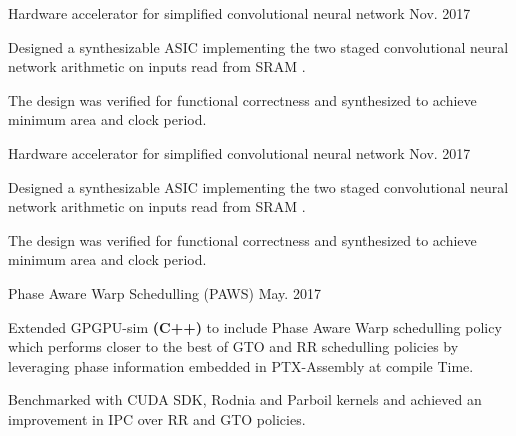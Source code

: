 \begin{cvprojects}
    \par\addvspace{0ex}
    \begin{flushleft}
    \par\addvspace{-1.5mm}
    \fontsize{10.4pt}{1em}\selectfont{}
    \end{flushleft}
    \par\addvspace{0.3ex}
    \cvproject
    {Hardware accelerator for simplified convolutional neural network }
    {\color{darkgray}Nov. 2017}
    {
      \begin{cvprojectitems}
        \item {Designed a synthesizable ASIC implementing the two staged convolutional neural network arithmetic on inputs read from SRAM . }
        \item {The design was verified for functional correctness and synthesized to achieve minimum area and clock period.} 
      \end{cvprojectitems}
    }

    \cvproject
    {Hardware accelerator for simplified convolutional neural network }
    {\color{darkgray}Nov. 2017}
    {
      \begin{cvprojectitems}
        \item {Designed a synthesizable ASIC implementing the two staged convolutional neural network arithmetic on inputs read from SRAM . }
        \item {The design was verified for functional correctness and synthesized to achieve minimum area and clock period.} 
      \end{cvprojectitems}
    }

    \par\addvspace{1ex}
    \begin{flushleft}
    \par\addvspace{-1.5mm}
    \fontsize{10.4pt}{1em}\selectfont{}
    \end{flushleft}
    \par\addvspace{0.3ex}
    \cvproject
    {Phase Aware Warp Schedulling (PAWS) }
    {\color{darkgray}May. 2017}
    {
      \begin{cvprojectitems}
        \item {Extended GPGPU-sim \textbf{(C++)} to include Phase Aware Warp schedulling policy which performs closer to the best of GTO and RR schedulling policies by leveraging phase information embedded in PTX-Assembly at compile Time.}
        \item {Benchmarked with CUDA SDK, Rodnia and Parboil kernels and achieved an improvement in IPC over RR and GTO policies.} 
      \end{cvprojectitems}
    }


\end{cvprojects}
